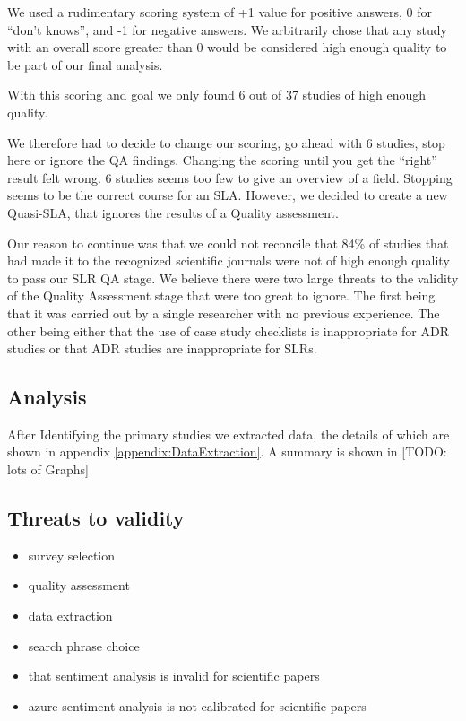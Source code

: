 We used a rudimentary scoring system of +1 value for positive answers, 0 for ``don't knows'', and -1 for negative answers.
We arbitrarily chose that any study with an overall score greater than 0 would be considered high enough quality to be part of our final analysis.

With this scoring and goal we only found 6 out of 37 studies of high enough quality.

We therefore had to decide to change our scoring, go ahead with 6 studies, stop here or ignore the QA findings.
Changing the scoring until you get the ``right'' result felt wrong.
6 studies seems too few to give an overview of a field.
Stopping seems to be the correct course for an SLA.
However, we decided to create a new Quasi-SLA, that ignores the results of a Quality assessment.

Our reason to continue was that we could not reconcile that 84\% of studies that had made it to the recognized scientific journals were not of high enough quality to pass our SLR QA stage.
We believe there were two large threats to the validity of the Quality Assessment stage that were too great to ignore.
The first being that it was carried out by a single researcher with no previous experience.
The other being either that the use of case study checklists is inappropriate for ADR studies or that ADR studies are inappropriate for SLRs.


\subsection{Analysis}
After Identifying the primary studies we extracted data, the details of which are shown in appendix \ref{appendix:DataExtraction}.
A summary is shown in 
[TODO: lots of Graphs]

\subsection{Threats to validity}

\begin{itemize}
    \item survey selection
    \item quality assessment
    \item data extraction
    \item search phrase choice
    \item that sentiment analysis is invalid for scientific papers
    \item azure sentiment analysis is not calibrated for scientific papers
\end{itemize}
 